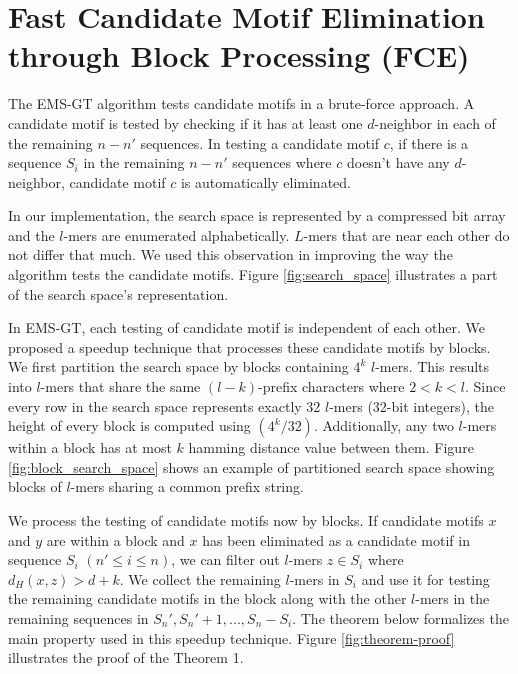 
\section{Fast Candidate Motif Elimination through Block Processing (FCE)}

The EMS-GT algorithm tests candidate motifs in a brute-force approach. A candidate motif is tested by checking if it has at least one $d$-neighbor in each of the remaining $n - n'$ sequences. In testing a candidate motif $c$, if there is a sequence $S_i$ in the remaining $n - n'$ sequences where $c$ doesn't have any $d$-neighbor, candidate motif $c$ is automatically eliminated.

In our implementation, the search space is represented by a compressed bit array and the $l$-mers are enumerated alphabetically. $L$-mers that are near each other do not differ that much. We used this observation in improving the way the algorithm tests the candidate motifs. Figure \ref{fig:search_space} illustrates a part of the search space's representation.



In EMS-GT, each testing of candidate motif is independent of each other. We proposed a speedup technique that processes these candidate motifs by blocks. We first partition the search space by blocks containing $4^k$ $l$-mers. This results into $l$-mers that share the same $(l-k)$-prefix characters where $2 < k < l$. Since every row in the search space represents exactly 32 $l$-mers (32-bit integers), the height of every block is computed using $(4^k / 32)$. Additionally, any two $l$-mers within a block has at most $k$ hamming distance value between them. Figure \ref{fig:block_search_space} shows an example of partitioned search space showing blocks of $l$-mers sharing a common prefix string. 



We process the testing of candidate motifs now by blocks. If candidate motifs $x$ and $y$ are within a block and $x$ has been eliminated as a candidate motif in sequence $S_i$ $(n' \leq i \leq n)$, we can filter out $l$-mers $z \in S_i$ where $d_H(x,z) > d + k$. We collect the remaining $l$-mers in $S_i$ and use it for testing the remaining candidate motifs in the block along with the other $l$-mers in the remaining sequences in ${S_n', S_n'+1, ..., S_n} - {S_i}$. The theorem below formalizes the main property used in this speedup technique. Figure \ref{fig:theorem-proof} illustrates the proof of the Theorem 1.

